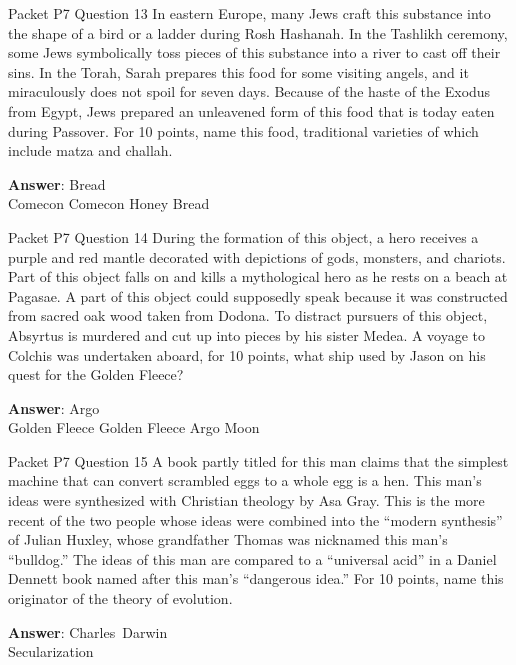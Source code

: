 \begin{frame}{Packet P7 Question 13}
In eastern Europe, many     Jews craft this substance into the shape of a bird or a ladder during Rosh Hashanah. In the Tashlikh ceremony, some Jews symbolically toss pieces of this substance into a river to cast off their sins. In the Torah, Sarah prepares this food for some visiting angels, and it miraculously does not spoil for seven days. Because of the haste of the Exodus from Egypt, Jews prepared an unleavened form of this food that is today eaten during Passover.   For 10 points, name this food, traditional varieties of which include matza and challah.  

\textbf{Answer}: Bread\\
 Comecon
 Comecon
 Honey
 Bread
\end{frame}

\begin{frame}{Packet P7 Question 14}
During the formation of this object, a hero receives a purple and red mantle decorated with depictions of gods, monsters, and chariots. Part of this object falls on and kills a mythological hero as he rests on a beach at Pagasae. A part of this object could supposedly speak because it was constructed from sacred oak wood taken from Dodona. To distract pursuers of this object, Absyrtus is murdered and   cut up into pieces by his sister Medea. A voyage to Colchis was undertaken aboard, for 10 points, what ship used by Jason on his quest for   the Golden Fleece?    

\textbf{Answer}: Argo\\
 Golden Fleece
 Golden Fleece
 Argo
 Moon
\end{frame}

\begin{frame}{Packet P7 Question 15}
A book partly titled for   this man claims that the simplest machine that can convert scrambled eggs to a whole egg is a hen. This man’s ideas were synthesized with Christian theology by Asa Gray. This is the more recent of the two people whose ideas were combined into the “modern synthesis” of Julian Huxley, whose grandfather Thomas was nicknamed this man’s “bulldog.”   The ideas of this man are compared to a “universal acid” in a Daniel Dennett   book named after this man’s “dangerous   idea.” For 10 points, name this originator of the theory   of evolution.

\textbf{Answer}: Charles\ Darwin\\
 Secularization
\end{frame}

